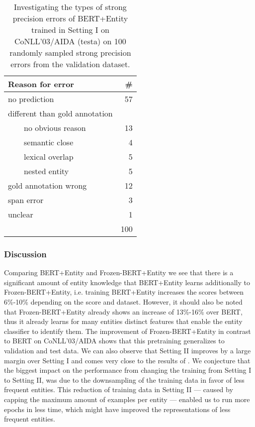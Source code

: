 \documentclass[11pt,a4paper]{article}
\begin{document}
\begin{table}[]
\centering
\begin{tabular}{@{}lr@{}}
\toprule
Reason for error               & \# \\ \midrule
no prediction                  & 57 \\
different than gold annotation &    \\
\ \ \ \ no obvious reason                & 13 \\
\ \ \ \ semantic close            & 4  \\
\ \ \ \ lexical overlap          & 5  \\
\ \ \ \ nested entity                  & 5  \\
gold annotation wrong          & 12 \\
span error                     & 3  \\
unclear                        & 1  \\ \bottomrule
                               & 100  \\ \bottomrule
\end{tabular}
\caption{Investigating the types of strong precision errors of BERT+Entity trained in Setting I on CoNLL’03/AIDA (testa) on 100 randomly sampled strong precision errors from the validation dataset.}
\label{tab:errorana}
\end{table}


\subsubsection{Discussion}

Comparing BERT+Entity and Frozen-BERT+Entity we see that there is a significant amount of entity knowledge that BERT+Entity learns additionally to Frozen-BERT+Entity, i.e. training BERT+Entity increases the scores between 6\%-10\% depending on the score and dataset. However, it should also be noted that Frozen-BERT+Entity already shows an increase of 13\%-16\% over BERT, thus it already learns for many entities distinct features that enable the entity classifier to identify them. The improvement of Frozen-BERT+Entity in contrast to BERT on CoNLL’03/AIDA shows that this pretraining generalizes to validation and test data. We can also observe that Setting II improves by a large margin over Setting I and comes very close to the results of \citet{kolitsas-etal-2018-end/Ganea}. We conjecture that the biggest impact on the performance from changing the training from  Setting I to Setting II, was due to the downsampling of the training data in favor of less frequent entities. This reduction of training data in Setting II --- caused by capping the maximum amount of examples per entity --- enabled us to run more epochs in less time, which might have improved the representations of less frequent entities.  
\end{document}
